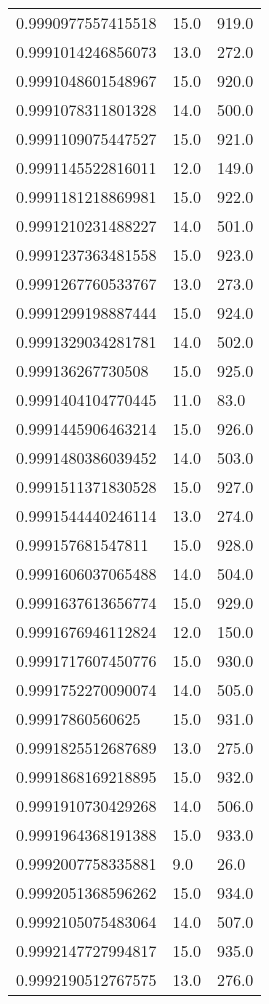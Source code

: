 \begin{center}
\begin{supertabular}[H]{p{0.30\textwidth}p{0.05\textwidth}p{0.05\textwidth}}
0.9990977557415518 & 15.0 & 919.0 \\ 
0.9991014246856073 & 13.0 & 272.0 \\ 
0.9991048601548967 & 15.0 & 920.0 \\ 
0.9991078311801328 & 14.0 & 500.0 \\ 
0.9991109075447527 & 15.0 & 921.0 \\ 
0.9991145522816011 & 12.0 & 149.0 \\ 
0.9991181218869981 & 15.0 & 922.0 \\ 
0.9991210231488227 & 14.0 & 501.0 \\ 
0.9991237363481558 & 15.0 & 923.0 \\ 
0.9991267760533767 & 13.0 & 273.0 \\ 
0.9991299198887444 & 15.0 & 924.0 \\ 
0.9991329034281781 & 14.0 & 502.0 \\ 
0.999136267730508 & 15.0 & 925.0 \\ 
0.9991404104770445 & 11.0 & 83.0 \\ 
0.9991445906463214 & 15.0 & 926.0 \\ 
0.9991480386039452 & 14.0 & 503.0 \\ 
0.9991511371830528 & 15.0 & 927.0 \\ 
0.9991544440246114 & 13.0 & 274.0 \\ 
0.999157681547811 & 15.0 & 928.0 \\ 
0.9991606037065488 & 14.0 & 504.0 \\ 
0.9991637613656774 & 15.0 & 929.0 \\ 
0.9991676946112824 & 12.0 & 150.0 \\ 
0.9991717607450776 & 15.0 & 930.0 \\ 
0.9991752270090074 & 14.0 & 505.0 \\ 
0.99917860560625 & 15.0 & 931.0 \\ 
0.9991825512687689 & 13.0 & 275.0 \\ 
0.9991868169218895 & 15.0 & 932.0 \\ 
0.9991910730429268 & 14.0 & 506.0 \\ 
0.9991964368191388 & 15.0 & 933.0 \\ 
0.9992007758335881 & 9.0 & 26.0 \\ 
0.9992051368596262 & 15.0 & 934.0 \\ 
0.9992105075483064 & 14.0 & 507.0 \\ 
0.9992147727994817 & 15.0 & 935.0 \\ 
0.9992190512767575 & 13.0 & 276.0 \\ 

\end{supertabular}
\end{center}
